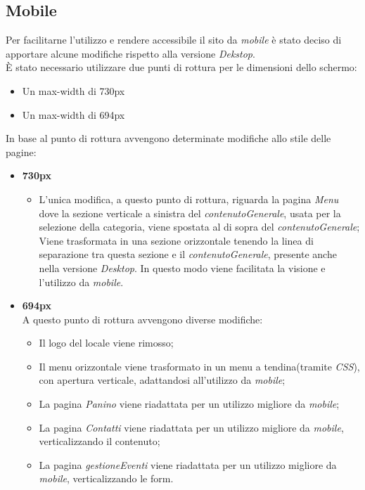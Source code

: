 \subsection{Mobile}
Per facilitarne l'utilizzo e rendere accessibile il sito da \emph{mobile} è stato deciso di apportare alcune modifiche rispetto alla versione \emph{Dekstop}.\\
È stato necessario utilizzare due punti di rottura per le dimensioni dello schermo:
\begin{itemize}
	\item Un max-width di 730px
	\item Un max-width di 694px
\end{itemize}
In base al punto di rottura avvengono determinate modifiche allo stile delle pagine:
\begin{itemize}
	\item \textbf{730px}
	\begin{itemize}
		\item L'unica modifica, a questo punto di rottura, riguarda la pagina \emph{Menu} dove la sezione verticale a sinistra del \emph{contenutoGenerale}, usata per la selezione della categoria, viene spostata al di sopra del \emph{contenutoGenerale};
Viene trasformata in una sezione orizzontale tenendo la linea di separazione tra questa sezione e il \emph{contenutoGenerale}, presente anche nella versione \emph{Desktop}. 
In questo modo viene facilitata la visione e l'utilizzo da \emph{mobile}.
	\end{itemize}
	\item \textbf{694px}\\
	A questo punto di rottura avvengono diverse modifiche:
	\begin{itemize}
		\item Il logo del locale viene rimosso;
		\item Il menu orizzontale viene trasformato in un menu a tendina(tramite \emph{CSS}), con apertura verticale, adattandosi all'utilizzo da \emph{mobile};
		\item La pagina \emph{Panino} viene riadattata per un utilizzo migliore da \emph{mobile};
		\item La pagina \emph{Contatti} viene riadattata per un utilizzo migliore da \emph{mobile}, verticalizzando il contenuto;
		\item La pagina \emph{gestioneEventi} viene riadattata per un utilizzo migliore da \emph{mobile}, verticalizzando le form.
	\end{itemize}
\end{itemize}